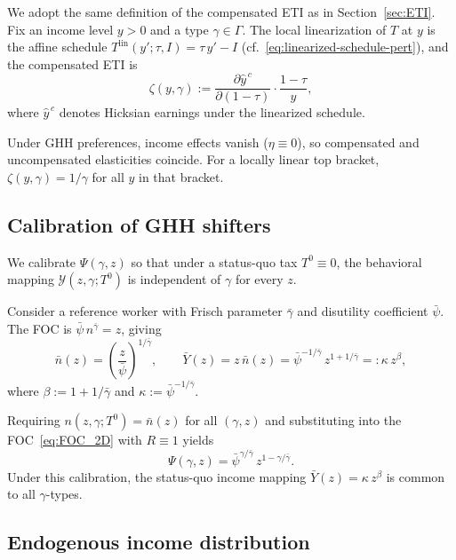 \documentclass[12pt,a4paper]{article}
\theoremstyle{definition}
\theoremstyle{plain}
\theoremstyle{remark}
\newcommand{\calY}{\mathcal{Y}}
\begin{document}
We adopt the same definition of the compensated ETI as in Section~\ref{sec:ETI}.  Fix an income level $y > 0$ and a type $\gamma \in \Gamma$.  The local linearization of $T$ at $y$ is the affine schedule $T^{\mathrm{lin}}(y';\tau,I) = \tau\,y' - I$ (cf.\ \eqref{eq:linearized-schedule-pert}), and the compensated ETI is
\begin{equation}
\label{eq:zeta_2D}
  \zeta(y,\gamma) := \frac{\partial \hat{y}^{\,c}}{\partial(1-\tau)} \cdot \frac{1-\tau}{y},
\end{equation}
where $\hat{y}^{\,c}$ denotes Hicksian earnings under the linearized schedule.

Under GHH preferences, income effects vanish ($\eta \equiv 0$), so compensated and uncompensated elasticities coincide.  For a locally linear top bracket, $\zeta(y,\gamma) = 1/\gamma$ for all $y$ in that bracket.

\subsection{Calibration of GHH shifters}
\label{sec:2D_calibration}

We calibrate $\Psi(\gamma,z)$ so that under a status-quo tax $T^0 \equiv 0$, the behavioral mapping $\calY(z,\gamma;T^0)$ is independent of $\gamma$ for every $z$.

Consider a reference worker with Frisch parameter $\bar\gamma$ and disutility coefficient $\bar\psi$.  The FOC is $\bar\psi\,n^{\bar\gamma} = z$, giving
\begin{equation}
\label{eq:ref_worker_2D}
  \bar{n}(z) = \left(\frac{z}{\bar\psi}\right)^{1/\bar\gamma}, \qquad
  \bar{Y}(z) = z\,\bar{n}(z) = \bar\psi^{-1/\bar\gamma}\,z^{1+1/\bar\gamma} =: \kappa\,z^{\beta},
\end{equation}
where $\beta := 1 + 1/\bar\gamma$ and $\kappa := \bar\psi^{-1/\bar\gamma}$.

Requiring $n(z,\gamma;T^0) = \bar{n}(z)$ for all $(\gamma,z)$ and substituting into the FOC~\eqref{eq:FOC_2D} with $R \equiv 1$ yields
\begin{equation}
\label{eq:Psi_cal_2D}
  \Psi(\gamma,z) = \bar\psi^{\gamma/\bar\gamma}\,z^{1-\gamma/\bar\gamma}.
\end{equation}
Under this calibration, the status-quo income mapping $\bar{Y}(z) = \kappa\,z^{\beta}$ is common to all $\gamma$-types.

\subsection{Endogenous income distribution}
\end{document}
